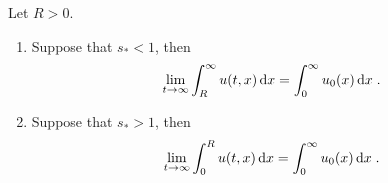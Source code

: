 \documentclass[11pt]{amsart}
\newcommand{\diff}{\,\mathrm{d}}
\begin{document}
\begin{proposition} Let $R>0$.
    \begin{enumerate}
        \item Suppose that $s_* < 1$, then
            \begin{align*}
            \lim_{t\to \infty} \int_R^\infty u(t,x) \diff x = \int_0^\infty u_0(x) \diff x
            \eqfinp
            \end{align*}
        \item Suppose that $s_* > 1$, then
            \begin{align*}
            \lim_{t\to \infty} \int_0^R u(t,x) \diff x = \int_0^\infty u_0(x) \diff x
            \eqfinp
            \end{align*}
    \end{enumerate}
\end{proposition}
\end{document}
